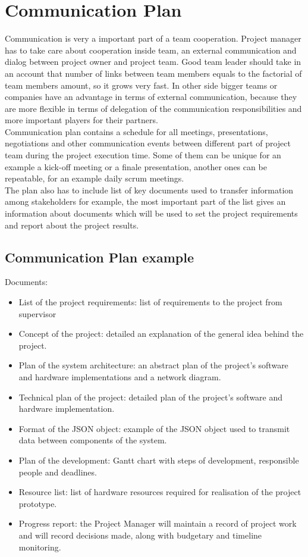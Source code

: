 \documentclass[english]{article}
\begin{document}
\section{Communication Plan}
Communication is very a important part of a team cooperation. Project manager has to take care about cooperation inside team, an external communication and dialog between project owner and project team. Good team leader should take in an account that number of links between team members equals to the factorial of team members amount, so it grows very fast. In other side bigger teams or companies have an advantage in terms of external communication, because they are more flexible in terms of delegation of the communication responsibilities and more important players for their partners.\cite{num}\\

Communication plan contains a schedule for all meetings, presentations, negotiations and other communication events between different part of project team during the project execution time. Some of them can be unique for an example a kick-off meeting or a finale presentation, another ones can be repeatable, for an example daily scrum meetings.\\

The plan also has to include list of key documents used to transfer information among stakeholders for example, the most important part of the list gives an information about documents which will be used to set the project requirements and report about the project results.\cite{man}\\

\subsection{Communication Plan example}
Documents: 
\begin{itemize}
\item List of the project requirements: list of requirements to the project from supervisor
\item Concept of the project: detailed an explanation of the general idea behind the project.
\item Plan of the system architecture: an abstract plan of the project's software and hardware implementations and a network diagram.
\item Technical plan of the project: detailed plan of the project's software and hardware implementation.
\item Format of the JSON object: example of the JSON object used to transmit data between components of the system.
\item Plan of the development: Gantt chart with steps of development, responsible people and deadlines.
\item Resource list: list of hardware resources required for realisation of the project prototype.
\item Progress report: the Project Manager will maintain a record of project work and will record decisions made, along with budgetary and timeline monitoring.
\end{itemize}
\end{document}
